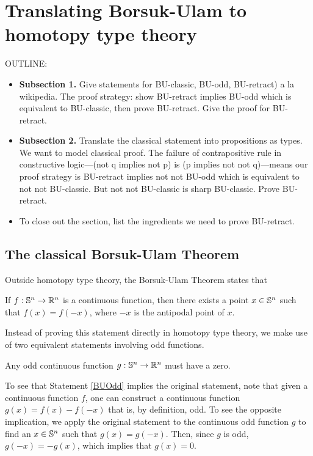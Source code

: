 \documentclass{amsart}
\begin{document}
\section{Translating Borsuk-Ulam to homotopy type theory}
\label{sec:bu-to-hott}

OUTLINE:
\begin{itemize}
\item
  \textbf{Subsection 1.} Give statements for BU-classic,
  BU-odd, BU-retract) a la wikipedia. The proof strategy:
  show BU-retract implies BU-odd which is equivalent to
  BU-classic, then prove BU-retract. Give the proof for
  BU-retract.
\item
  \textbf{Subsection 2.} Translate the classical statement
  into propositions as types. We want to model classical proof.
  The failure of contrapositive rule in constructive
  logic---(not q implies not p) is (p implies not not
  q)---means our proof strategy is BU-retract implies not
  not BU-odd which is equivalent to not not BU-classic. But
  not not BU-classic is sharp BU-classic. Prove BU-retract. 
\item
  To close out the section, list the ingredients we need to
  prove BU-retract.
\end{itemize}

\subsection{The classical Borsuk-Ulam Theorem}

Outside homotopy type theory, the Borsuk-Ulam Theorem states that 

\begin{statement}\label{BUClassic}
If $f: \mathbb{S}^n \rightarrow \mathbb{R}^n$ is a continuous function, then there exists a point $x \in \mathbb{S}^n$ such that $f(x) = f(-x)$, where $-x$ is the antipodal point of $x$. 
\end{statement}

Instead of proving this statement directly in homotopy type theory, we make use of two equivalent statements involving odd functions.

\begin{statement}\label{BUOdd}
Any odd continuous function $g: \mathbb{S}^n \rightarrow \mathbb{R}^n$ must have a zero.
\end{statement}

To see that Statement \ref{BUOdd} implies the original statement, note that given a continuous function $f$, one can construct a continuous function $g(x) = f(x) - f(-x)$ that is, by definition, odd. To see the opposite implication, we apply the original statement to the continuous odd function $g$ to find an $x \in \mathbb{S}^n$ such that $g(x)=g(-x)$. Then, since $g$ is odd, $g(-x) = -g(x)$, which implies that $g(x)=0$.
\end{document}
